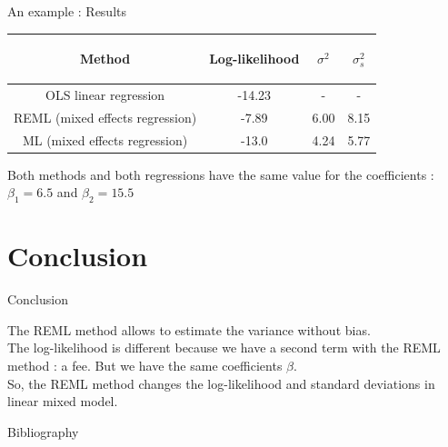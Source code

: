 \documentclass[unknownkeysallowed]{beamer}
\begin{document}
\begin{frame}{An example : Results}

\begin{table}[h!]
    \centering
    \begin{tabular}{| c | c | c|c|}
        \hline
        \begin{bf} Method \end{bf} &
        \begin{bf} Log-likelihood \end{bf} &
        \begin{bf} $\sigma^2$ \end{bf} &
        \begin{bf} $\sigma_s^2$ \end{bf} \\
        \hline
        OLS linear regression &  -14.23 & - & -\\
        REML (mixed effects regression)  & -7.89 & 6.00 & 8.15 \\
        ML (mixed effects regression) & -13.0 & 4.24 & 5.77 \\
        \hline
    \end{tabular}
\end{table}
\vspace{1cm}
Both methods and both regressions have the same value for the coefficients : $\beta_1=6.5$ and $\beta_2=15.5$
\end{frame}


\section{Conclusion}
\label{sec:conclusion}


\begin{frame}{Conclusion}

The REML method allows to estimate the variance without bias.\\
\vspace{0.5cm}
The log-likelihood is different because we have a second term with the REML method : a fee. But we have the same coefficients $\beta$.\\
\vspace{0.5cm}
So, the REML method changes the log-likelihood and standard deviations in linear mixed model.
\end{frame}

\begin{frame}{Bibliography}
\nocite{*}
\printbibliography
\end{frame}
\end{document}
